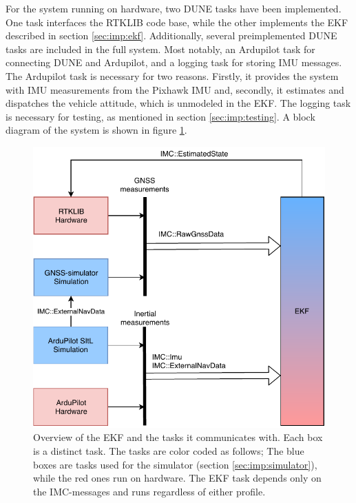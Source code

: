     
For the system running on hardware, two DUNE tasks have been implemented. One task interfaces the RTKLIB code base, while the other implements the EKF described in section \ref{sec:imp:ekf}. Additionally, several preimplemented DUNE tasks are included in the full system. Most notably, an Ardupilot task for connecting DUNE and Ardupilot, and a logging task for storing IMU messages. The Ardupilot task is necessary for two reasons. Firstly, it provides the system with IMU measurements from the Pixhawk IMU and, secondly, it estimates and dispatches the vehicle attitude, which is unmodeled in the EKF. The logging task is necessary for testing, as mentioned in section \ref{sec:imp:testing}. A block diagram of the system is shown in figure \ref{fig:dune-tasks}.\\

    \begin{figure}[!htbp]
    \centering
    \includegraphics[scale=0.8]{Implementation/Images/dune-tasks.pdf}
    \caption{Overview of the EKF and the tasks it communicates with. Each box is a distinct task. The tasks are color coded as follows; The blue boxes are tasks used for the simulator (section \ref{sec:imp:simulator}), while the red ones run on hardware. The EKF task depends only on the IMC-messages and runs regardless of either profile.}
    \label{fig:dune-tasks}
    \end{figure}

